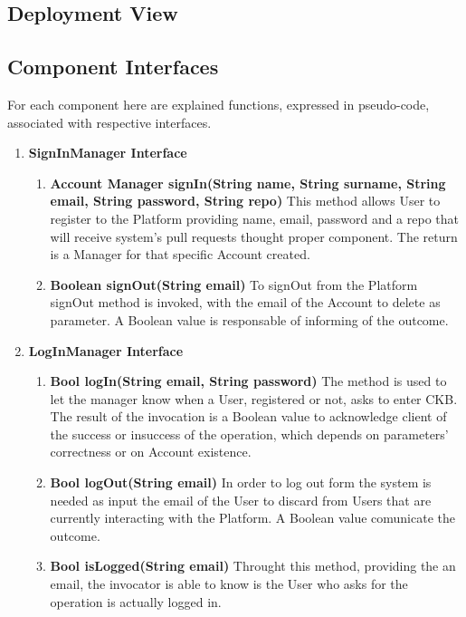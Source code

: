 \subsection{Deployment View}
\subsection{Component Interfaces}
For each component here are explained functions, expressed in pseudo-code, associated with respective interfaces.
\begin{enumerate}
    \item \textbf{SignInManager Interface} 
            \begin{enumerate}[label=$\bullet$]
                \item \textbf{Account Manager signIn(String name, String surname, String email, String password, String repo)} This method allows User to register to the Platform providing name, email, password and a repo that will receive system's pull requests thought proper component. The return is a Manager for that specific Account created.
                \item \textbf{Boolean signOut(String email)} To signOut from the Platform signOut method is invoked, with the email of the Account to delete as parameter. A Boolean value is responsable of informing of the outcome.
            \end{enumerate}
    \item \textbf{LogInManager Interface}
        \begin{enumerate}[label=$\bullet$]
            \item \textbf{Bool logIn(String email, String password)} The method is used to let the manager know when a User, registered or not, asks to enter CKB. The result of the invocation is a Boolean value to acknowledge client of the success or insuccess of the operation, which depends on parameters' correctness or on Account existence.
            \item \textbf{Bool logOut(String email)} In order to log out form the system is needed as input the email of the User to discard from Users that are currently interacting with the Platform. A Boolean value comunicate the outcome.
            \item \textbf{Bool isLogged(String email)} Throught this method, providing the an email, the invocator is able to know is the User who asks for the operation is actually logged in.
        \end{enumerate}

\end{enumerate}

